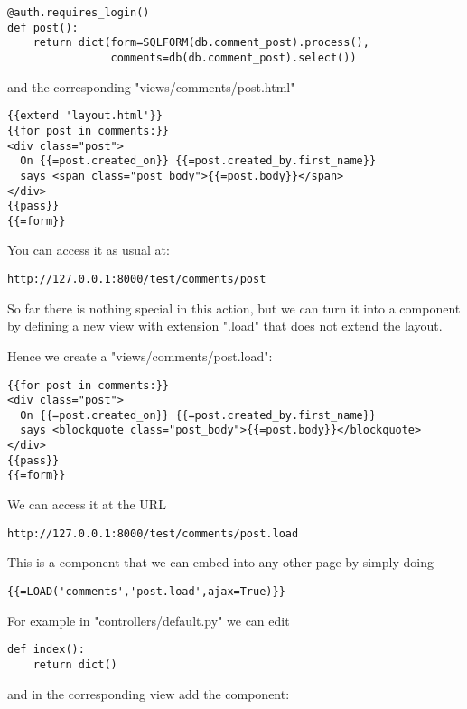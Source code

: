 \documentclass[justified,sixbynine,notoc]{tufte-book}
\begin{document}
\begin{fullwidth}
\begin{lstlisting}
@auth.requires_login()
def post():
    return dict(form=SQLFORM(db.comment_post).process(),
                comments=db(db.comment_post).select())
\end{lstlisting}
\noindent and the corresponding "views/comments/post.html"

\begin{lstlisting}[keywords={}]
{{extend 'layout.html'}}
{{for post in comments:}}
<div class="post">
  On {{=post.created_on}} {{=post.created_by.first_name}}
  says <span class="post_body">{{=post.body}}</span>
</div>
{{pass}}
{{=form}}
\end{lstlisting}

You can access it as usual at:

\begin{lstlisting}[keywords={}]
http://127.0.0.1:8000/test/comments/post
\end{lstlisting}

So far there is nothing special in this action, but we can turn it into a component by defining a new view with extension ".load" that does not extend the layout.

Hence we create a "views/comments/post.load":

\begin{lstlisting}[keywords={}]
{{for post in comments:}}
<div class="post">
  On {{=post.created_on}} {{=post.created_by.first_name}}
  says <blockquote class="post_body">{{=post.body}}</blockquote>
</div>
{{pass}}
{{=form}}
\end{lstlisting}

We can access it at the URL

\begin{lstlisting}[keywords={}]
http://127.0.0.1:8000/test/comments/post.load
\end{lstlisting}

This is a component that we can embed into any other page by simply doing

\begin{lstlisting}[keywords={}]
{{=LOAD('comments','post.load',ajax=True)}}
\end{lstlisting}

For example in "controllers/default.py" we can edit

\begin{lstlisting}
def index():
    return dict()
\end{lstlisting}
\noindent and in the corresponding view add the component:


\end{fullwidth}
\end{document}
